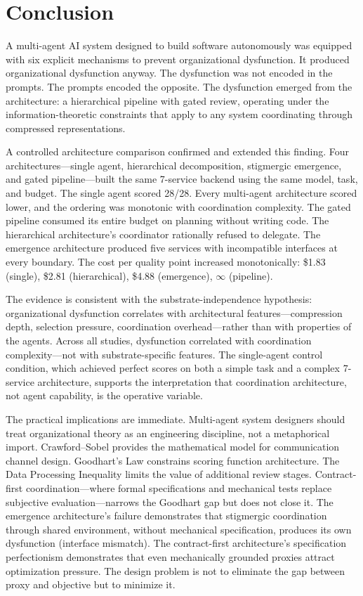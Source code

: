 \documentclass[11pt,a4paper]{article}
\begin{document}
\section{Conclusion}
\label{sec:conclusion}

A multi-agent AI system designed to build software autonomously was equipped with six explicit mechanisms to prevent organizational dysfunction. It produced organizational dysfunction anyway. The dysfunction was not encoded in the prompts. The prompts encoded the opposite. The dysfunction emerged from the architecture: a hierarchical pipeline with gated review, operating under the information-theoretic constraints that apply to any system coordinating through compressed representations.

A controlled architecture comparison confirmed and extended this finding. Four architectures---single agent, hierarchical decomposition, stigmergic emergence, and gated pipeline---built the same 7-service backend using the same model, task, and budget. The single agent scored 28/28. Every multi-agent architecture scored lower, and the ordering was monotonic with coordination complexity. The gated pipeline consumed its entire budget on planning without writing code. The hierarchical architecture's coordinator rationally refused to delegate. The emergence architecture produced five services with incompatible interfaces at every boundary. The cost per quality point increased monotonically: \$1.83 (single), \$2.81 (hierarchical), \$4.88 (emergence), $\infty$ (pipeline).

The evidence is consistent with the substrate-independence hypothesis: organizational dysfunction correlates with architectural features---compression depth, selection pressure, coordination overhead---rather than with properties of the agents. Across all studies, dysfunction correlated with coordination complexity---not with substrate-specific features. The single-agent control condition, which achieved perfect scores on both a simple task and a complex 7-service architecture, supports the interpretation that coordination architecture, not agent capability, is the operative variable.

The practical implications are immediate. Multi-agent system designers should treat organizational theory as an engineering discipline, not a metaphorical import. Crawford--Sobel provides the mathematical model for communication channel design. Goodhart's Law constrains scoring function architecture. The Data Processing Inequality limits the value of additional review stages. Contract-first coordination---where formal specifications and mechanical tests replace subjective evaluation---narrows the Goodhart gap but does not close it. The emergence architecture's failure demonstrates that stigmergic coordination through shared environment, without mechanical specification, produces its own dysfunction (interface mismatch). The contract-first architecture's specification perfectionism demonstrates that even mechanically grounded proxies attract optimization pressure. The design problem is not to eliminate the gap between proxy and objective but to minimize it.
\end{document}
